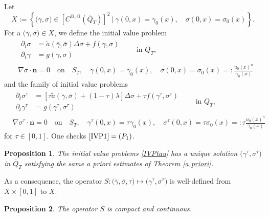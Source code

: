 \documentclass[a4paper,11pt]{article}
\newtheorem{proposition}{Proposition}[section]
\theoremstyle{remark}
\begin{document}
Let $$X:=\left\{ \big(\gamma,\sigma\big) \in \left[C^{@,@}(\bar{Q}_T)\right]^2 ~\Big|~ \gamma(0,x)=\gamma_0(x), \quad \sigma(0,x) = \sigma_0(x)\right\}.$$
For a $\big(\bar\gamma,\bar\sigma\big) \in X$, we define the initial value problem 
\begin{equation} \label{IVP1}\tag{$P$}
 \begin{aligned}
  &\begin{aligned}
   \partial_t \sigma &= \tilde{a}(\bar\gamma,\bar\sigma)\Delta \sigma + f(\gamma,\sigma)\\
   \partial_t \gamma &= g(\gamma,\sigma)
  \end{aligned}  \quad \quad \text{in $Q_T$,}\\
  &\nabla\sigma \cdot \mathbf{n} = 0 \quad \text{on} \quad S_T, \quad \gamma(0,x) = \gamma_0(x), \quad \sigma(0,x)=\sigma_0(x)=:\frac{u_0(x)^n}{\gamma_0(x)}
  \end{aligned}
\end{equation}
and the family of initial value problems 
\begin{equation} \label{IVPtau}\tag{$P_\tau$}
 \begin{aligned}
  &\begin{aligned}
   \partial_t \sigma^\tau &= \left[\tau\tilde{a}(\bar\gamma,\bar\sigma) + (1-\tau)\lambda\right]\Delta \sigma + \tau f(\gamma^\tau,\sigma^\tau)\\
   \partial_t \gamma^\tau &= g(\gamma^\tau,\sigma^\tau)
  \end{aligned}  \quad \quad \text{in $Q_T$,}\\
  &\nabla\sigma^\tau \cdot \mathbf{n} = 0 \quad \text{on} \quad S_T, \quad \gamma^\tau(0,x) = \tau\gamma_0(x), \quad \sigma^\tau(0,x)=\tau\sigma_0(x)=:\tau\frac{u_0(x)^n}{\gamma_0(x)}
  \end{aligned}
\end{equation}
for $\tau \in [0,1]$. One checks $\eqref{IVP1}=(P_1)$.

\begin{proposition} The initial value problems \eqref{IVPtau} has a unique solution $\big(\gamma^\tau,\sigma^\tau\big)$ in $\bar{Q}_T$ satisfying the same a priori estimates of Theorem \ref{a priori}.
\end{proposition}
As a consequence, the operator $S : \big(\bar\gamma,\bar\sigma,\tau\big) \mapsto (\gamma^\tau,\sigma^\tau\big)$ is well-defined from $X \times [0,1]$ to $X$.
\begin{proposition} The operator $S$ is compact and continuous.
\end{proposition}
\end{document}
